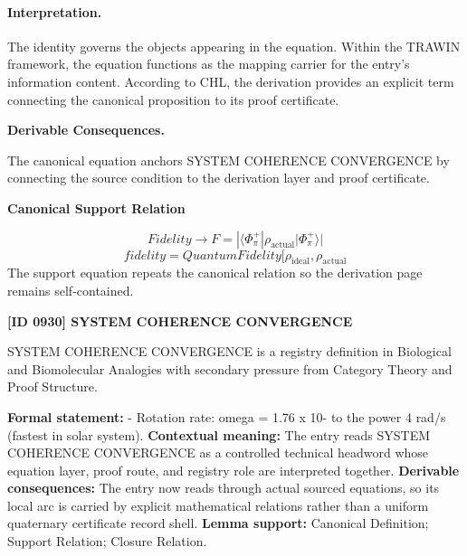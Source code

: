 \paragraph{Interpretation.}
The identity governs the objects appearing in the equation. Within the TRAWIN framework, the equation functions as the mapping carrier for the entry’s information content. According to CHL, the derivation provides an explicit term connecting the canonical proposition to its proof certificate.

\par\vspace{0.35em}
\noindent\textbf{Derivable Consequences.}\quad
\begingroup
\footnotesize
\raggedright
The canonical equation anchors SYSTEM COHERENCE CONVERGENCE by connecting the source condition to the derivation layer and proof certificate.
\par\endgroup

\noindent\textbf{Canonical Support Relation}\par
\[
Fidelity \to F = |\langle\Phi_\pi^+|\rho_{\mathrm{actual}}\lvert \Phi_\pi^+ \rangle|
\]
\[
fidelity = QuantumFidelity[\rho_{\mathrm{ideal}}, \rho_{\mathrm{actual}}
\]
\noindent The support equation repeats the canonical relation so the derivation page remains self-contained.\par

\clearpage
\noindent\textbf{[ID 0930] SYSTEM COHERENCE CONVERGENCE}\par
\vspace{0.35em}
\begingroup\small
{}
SYSTEM COHERENCE CONVERGENCE is a registry definition in Biological and Biomolecular Analogies with secondary pressure from Category Theory and Proof Structure.

\begingroup\footnotesize\setlength{\emergencystretch}{3em}\sloppy
\textbf{Formal statement:} - Rotation rate: omega = 1.76 x 10- to the power 4 rad/s (fastest in solar system). \textbf{Contextual meaning:} The entry reads SYSTEM COHERENCE CONVERGENCE as a controlled technical headword whose equation layer, proof route, and registry role are interpreted together. \textbf{Derivable consequences:} The entry now reads through actual sourced equations, so its local arc is carried by explicit mathematical relations rather than a uniform quaternary certificate record shell. \textbf{Lemma support:} Canonical Definition; Support Relation; Closure Relation.\par
\endgroup

